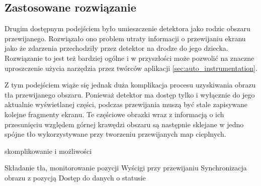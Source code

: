 \subsection{Zastosowane rozwiązanie}
Drugim dostępnym podejściem było umieszczenie detektora jako rodzic obszaru przewijanego. Rozwiązało ono problem utraty informacji o przewijaniu ekranu jako że zdarzenia przechodziły przez detektor na drodze do jego dziecka. Rozwiązanie to jest też bardziej ogólne i w przyszłości może pozwolić na znaczne uproszczenie użycia narzędzia przez twórców aplikacji \ref{sec:auto_instrumentation}. 

Z tym podejściem wiąże się jednak duża komplikacja procesu uzyskiwania obrazu tła przewijanego obszaru. Ponieważ detektor ma dostęp tylko i wyłącznie do jego aktualnie wyświetlanej części, podczas przewijania muszą być stale zapisywane kolejne fragmenty ekranu. Te częściowe obrazki wraz z informacją o ich przesunięciu względem górnej krawędzi obszaru są następnie sklejane w jedno spójne tło wykorzystywane przy tworzeniu przewijanych map cieplnych.

skomplikowanie i możliwości

Składanie tła, monitorowanie pozycji
Wyścigi przy przewijaniu
Synchronizacja obrazu z pozycją
Dostęp do danych o statusie
